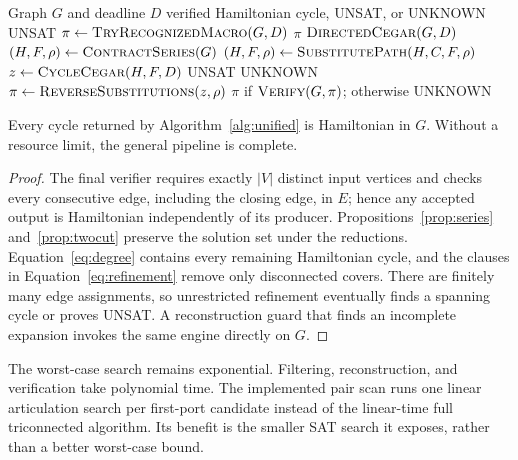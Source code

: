 \documentclass[sigconf,anonymous]{aamas}
\newcommand{\method}{\textsc{StructHCP}\xspace}
\begin{document}
\begin{algorithm}[t]
  \caption{\method solving pipeline}
  \label{alg:unified}
  \small
  \begin{algorithmic}[1]
    \Require Graph $G$ and deadline $D$
    \Ensure verified Hamiltonian cycle, UNSAT, or UNKNOWN
      \State \Return UNSAT
    \EndIf
    \State $\pi\gets\Call{TryRecognizedMacro}{G,D}$
      \State \Return $\pi$
    \EndIf
      \State \Return $\Call{DirectedCegar}{G,D}$
    \EndIf
    \State $(H,F,\rho)\gets\Call{ContractSeries}{G}$
      \State $(H,F,\rho)\gets\Call{SubstitutePath}{H,C,F,\rho}$
    \EndWhile
    \State $z\gets\Call{CycleCegar}{H,F,D}$
     \State \Return UNSAT \EndIf
     \State \Return UNKNOWN \EndIf
    \State $\pi\gets\Call{ReverseSubstitutions}{z,\rho}$
    \State \Return $\pi$ if $\Call{Verify}{G,\pi}$; otherwise UNKNOWN
  \end{algorithmic}
\end{algorithm}

\begin{proposition}
\label{prop:soundness}
Every cycle returned by Algorithm~\ref{alg:unified} is Hamiltonian in
$G$. Without a resource limit, the general pipeline is complete.
\end{proposition}
\begin{proof}
The final verifier requires exactly $|V|$ distinct input vertices and
checks every consecutive edge, including the closing edge, in $E$; hence
any accepted output is Hamiltonian independently of its producer.
Propositions~\ref{prop:series} and~\ref{prop:twocut} preserve the solution
set under the reductions. Equation~\eqref{eq:degree} contains every
remaining Hamiltonian cycle, and the clauses in
Equation~\eqref{eq:refinement} remove only disconnected covers. There are
finitely many edge assignments, so unrestricted refinement eventually
finds a spanning cycle or proves UNSAT. A reconstruction guard that
finds an incomplete expansion invokes the same engine directly on $G$.
\end{proof}

The worst-case search remains exponential. Filtering, reconstruction,
and verification take polynomial time. The implemented pair scan runs
one linear articulation search per first-port candidate instead of the
linear-time full triconnected algorithm. Its benefit is the smaller SAT
search it exposes, rather than a better worst-case bound.
\end{document}
